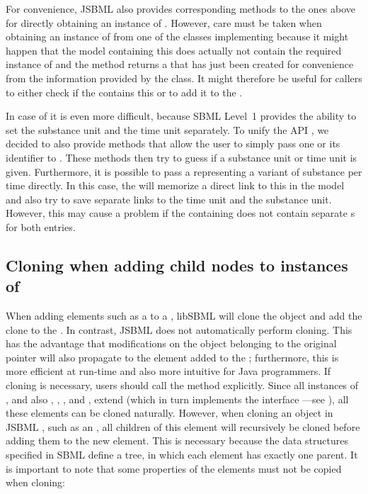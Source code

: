 
For convenience, JSBML also provides corresponding methods to the ones
above for directly obtaining an instance of \UnitDefinition.  However, care
must be taken when obtaining an instance of \UnitDefinition from one of the
classes implementing \SBaseWithUnit because it might happen that the
model containing this \SBaseWithUnit does actually not contain
the required instance of \UnitDefinition and the method returns a
 that has just been created for convenience from the
information provided by the class. It might therefore be useful for callers
to either check if the \Model{} contains this \UnitDefinition or to add it
to the \Model.

In case of \KineticLaw it is even more difficult, because SBML
Level~1 provides the ability to set the substance unit
and the time unit separately. To unify the API
, we decided to also provide methods that
allow the user to simply pass one \UnitDefinition or its identifier to
\KineticLaw.  These methods then try to guess if a substance unit or time
unit is given. Furthermore, it is possible to pass a \UnitDefinition
representing a variant of substance per time directly. In this case, the
\KineticLaw will memorize a direct link to this \UnitDefinition in the
model and also try to save separate links to the time unit and
the substance unit. However, this may cause a problem if the containing
\Model does not contain separate \UnitDefinition{}s for both entries.


\subsection{Cloning when adding child nodes to instances of }

When adding elements such as a \Species to a \Model, libSBML 
will clone the object and add the clone to the \Model. In contrast, JSBML
does not automatically perform cloning. This has the advantage that
modifications on the object belonging to the original pointer will also
propagate to the element added to the \Model; furthermore, this is more
efficient at run-time and also more intuitive for Java programmers. If
cloning is necessary, users should call the  method
explicitly. Since all instances of \SBase, and also \Annotation, \ASTNode,
\CVTerm, and \History, extend \AbstractTreeNode (which in turn implements the
interface \Cloneable---see ), all these elements can
be cloned naturally.  However, when cloning an object in JSBML
, such as an \AbstractNamedSBase, all children of this element
will recursively be cloned before adding them to the new element. This is
necessary because the data structures specified in SBML
 define a tree, in which each element has
exactly one parent. It is important to note that some properties of the
elements must not be copied when cloning:

